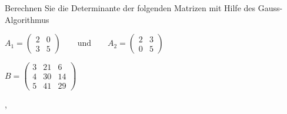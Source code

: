 Berechnen Sie die Determinante der folgenden Matrizen mit Hilfe des
Gauss-Algorithmus
\begin{teilaufgaben}
\item
$
\displaystyle
A_1 = \begin{pmatrix}2&0\\3&5\end{pmatrix}
\qquad\text{und}\qquad
A_2 = \begin{pmatrix}2&3\\0&5\end{pmatrix}
$
\item
$\displaystyle
B=\begin{pmatrix}
3&21& 6\\
4&30&14\\
5&41&29
\end{pmatrix}$
\end{teilaufgaben}


\begin{hinweis}
\begin{teilaufgaben}
\item {},
\item {}
\end{teilaufgaben}
\end{hinweis}

